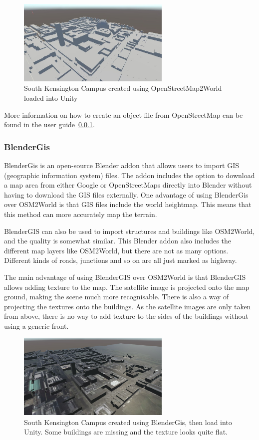 \begin{figure}[H]
    \centering
    \includegraphics[width=0.65\textwidth]{06_Implementation/00_Maps/Images/OSM1Cropped.JPG}
    \caption{South Kensington Campus created using OpenStreetMap2World loaded into Unity}
\end{figure}

More information on how to create an object file from OpenStreetMap can be found in the user guide~\ref{}.
\subsubsection{BlenderGis}
BlenderGis is an open-source Blender addon that allows users to import GIS (geographic information system) files. The addon includes the option to download a map area from either Google or OpenStreetMaps directly into Blender without having to download the GIS files externally. One advantage of using BlenderGis over OSM2World is that GIS files include the world heightmap. This means that this method can more accurately map the terrain. 

BlenderGIS can also be used to import structures and buildings like OSM2World, and the quality is somewhat similar. This Blender addon also includes the different map layers like OSM2World, but there are not as many options. Different kinds of roads, junctions and so on are all just marked as highway. 

The main advantage of using BlenderGIS over OSM2World is that BlenderGIS allows adding texture to the map. The satellite image is projected onto the map ground, making the scene much more recognisable. There is also a way of projecting the textures onto the buildings. As the satellite images are only taken from above, there is no way to add texture to the sides of the buildings without using a generic front. 

\begin{figure}[H]
    \centering
    \includegraphics[width=0.65\textwidth]{06_Implementation/00_Maps/Images/BlenderGis1Cropped.JPG}
    \caption{South Kensington Campus created using BlenderGis, then load into Unity. Some buildings are missing and the texture looks quite flat.}
\end{figure}

